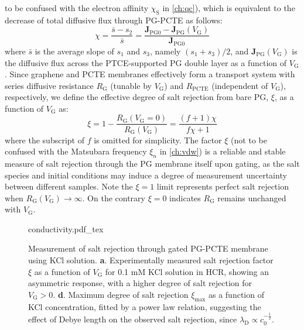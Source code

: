 to be confused with the electron affinity $\chi_{\mathrm{S}}$ in
\autoref{ch:qc}), which is equivalent to the decrease of total
diffusive flux through PG-PCTE as follows:
\begin{equation}
  \label{eq:np-rejection}
  \chi = \frac{\bar{s} - s_{2}}{\bar{s}} = \frac{\symbf{J}_{\mathrm{PG0}}
    - \symbf{J}_{\mathrm{PG}}(V_{\mathrm{G}})}{\symbf{J}_{\mathrm{PG0}}}
\end{equation}
where $\bar{s}$ is the average slope of $s_{1}$ and $s_{3}$, namely
$(s_{1} + s_{3})/2$, and
$\symbf{J}_{\mathrm{PG}}(V_{\mathrm{G}})$ is the diffusive flux
across the PTCE-supported PG double layer as a function of
$V_{\mathrm{G}}$. Since graphene and PCTE membranes effectively form a
transport system with series diffusive resistance $R_{\mathrm{G}}$
(tunable by $V_{\mathrm{G}}$) and $R_{\mathrm{PCTE}}$ (independent of
$V_{\mathrm{G}}$), respectively, we define the effective degree of
salt rejection from bare PG, $\xi$, as a function of $V_{\mathrm{G}}$ as:
\begin{equation}
\label{eq:np-xi-def}
\xi = 1 - \frac{R_{\mathrm{G}}(V_{\mathrm{G}}=0)}{R_{\mathrm{G}}(V_{\mathrm{G}})} = \frac{(f+1) \chi}{f \chi + 1}
\end{equation}
where the subscript of $f$ is omitted for simplicity. The factor $\xi$
(not to be confused with the Matsubara frequency $\xi_{n}$ in
\autoref{ch:vdw}) is a reliable and stable measure of salt rejection
through the PG membrane itself upon gating, as the salt species and
initial conditions may induce a degree of measurement uncertainty
between different samples. Note the $\xi=1$ limit represents perfect
salt rejection when $R_{\mathrm{G}}(V_{\mathrm{G}}) \to \infty$. On
the contrary $\xi=0$ indicates $R_{\mathrm{G}}$ remains unchanged with
$V_{\mathrm{G}}$.
\begin{figure}[H]
  \centering
   {conductivity.pdf_tex}
   \caption{Measurement of salt rejection through gated PG-PCTE
     membrane using KCl solution.  \textbf{a}. Experimentally measured
     salt rejection factor $\xi$ as a function of $V_{\mathrm{G}}$ for
     0.1 mM KCl solution in HCR, showing an asymmetric response, with
     a higher degree of salt rejection for
     $V_{\mathrm{G}}>0$. %
     \textbf{d}. Maximum degree of salt rejection $\xi_{\mathrm{max}}$ as a function of KCl
     concentration, fitted by a power law relation, suggesting the
     effect of Debye length on the observed salt rejection, since
     $\lambda_{\mathrm{D}} \propto c_{0}^{-\frac{1}{2}}$.}
  \label{fig:np-conductivity-rej} 
\end{figure}

